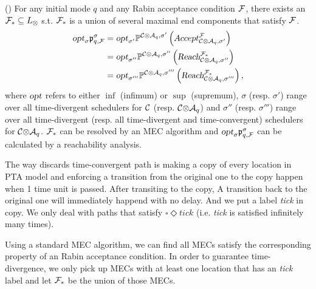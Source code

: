 \vspace{-0.8em}
\begin{corollary}{(\cite{DBLP:conf/qest/Sproston11})}\label{crly:opt}
For any initial mode $q$ and any Rabin acceptance condition $\rabin$,
there exists an $\rabin_* \subseteq \locs_\otimes$ s.t. $\rabin_*$ is a union of several maximal end
components that satisfy $\rabin$. 
\begin{align*}
    \opt_\sigma\pr{\dtloc,\rabin}{\sigma}
        & =  
            \opt_{\sigma'}
            \probm^{\product{\pta}{\dta_\dtloc},\sigma'}\left(
                \Accept
                    {\product{\pta}{\dta_\dtloc},\sigma'}
                    {\rabin}
            \right) \\
        & = 
            \opt_{\sigma''}
            \probm^{\product{\pta}{\dta_\dtloc},\sigma''}\left(
                \omgpaths
                    {\product{\pta}{\dta_\dtloc},\sigma''}
                    {\rabin_*} 
            \right) \\
        & = 
            \opt_{\sigma'''}
            \probm^{\product{\pta}{\dta_\dtloc},\sigma'''}\left(
                \omgpaths
                    {\product{\pta}{\dta_\dtloc},\sigma'''}
                    {\rabin_*}
            \right),
\end{align*}
where $\opt$ refers to either $\inf$ (infimum) or $\sup$ (supremum),
$\sigma$ (resp. $\sigma'$) range over all time-divergent schedulers 
for $\pta$ (resp. $\product{\pta}{\dta_\dtloc}$) and $\sigma''$ (resp. 
$\sigma'''$) range over all time-divergent (resp. all time-divergent and 
time-convergent) schedulers for $\product{\pta}{\dta_\dtloc}$. $\rabin_*$ can be 
resolved by an MEC algorithm and $\opt_\sigma\pr{\dtloc,\rabin}{\sigma}$
can be calculated by a reachability analysis.
\end{corollary}
The way \cite{DBLP:conf/qest/Sproston11} discards time-convergent path
is making a copy of every location in PTA model and enforcing a transition 
from the original one to the copy happen when 1 time unit is passed. After 
transiting to the copy, A transition back to the original one will immediately
happend with no delay. And we put a label \textit{tick} in copy. We only deal with 
paths that satisfy $ \square \Diamond tick $ (i.e. \textit{tick} is satisfied 
infinitely many times).

Using a standard MEC algorithm, we can find all MECs satisfy the corresponding
property of an Rabin acceptance condition. In order to guarantee time-divergence,
we only pick up MECs with at least one location that has an \textit{tick} label and 
let $\rabin_*$ be the union of those MECs.

\vspace{-0.8em}





